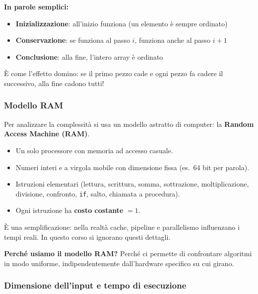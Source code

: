 \documentclass[a4paper, 11pt]{article}
\theoremstyle{definition}
\theoremstyle{remark}
\theoremstyle{remark}
\newenvironment{nota}{%
	\begin{tcolorbox}[
		colback=codebg,
		colframe=primary,
		fonttitle=\bfseries,
		title=Nota,
		left=6pt, right=6pt, top=4pt, bottom=4pt
		]
	}{%
	\end{tcolorbox}
}
\begin{document}
	\begin{softnote}
		\textbf{In parole semplici:}
		\begin{itemize}
			\item \textbf{Inizializzazione}: all'inizio funziona (un elemento è sempre ordinato)
			\item \textbf{Conservazione}: se funziona al passo $i$, funziona anche al passo $i+1$
			\item \textbf{Conclusione}: alla fine, l'intero array è ordinato
		\end{itemize}
		
		È come l'effetto domino: se il primo pezzo cade e ogni pezzo fa cadere il successivo, alla fine cadono tutti!
	\end{softnote}
	
	\subsubsection*{Modello RAM}
	
	
	Per analizzare la complessità si usa un modello astratto di
	computer: la \textbf{Random Access Machine (RAM)}.
	
	\begin{itemize}
		\item Un solo processore con memoria ad accesso casuale.
		\item Numeri interi e a virgola mobile con dimensione fissa
		(es.\ 64 bit per parola).
		\item Istruzioni elementari (lettura, scrittura, somma,
		sottrazione, moltiplicazione, divisione, confronto,
		\texttt{if}, salto, chiamata a procedura).
		\item Ogni istruzione ha \textbf{costo costante} $= 1$.
	\end{itemize}
	
	\begin{nota}
		È una semplificazione: nella realtà cache, pipeline e
		parallelismo influenzano i tempi reali. In questo corso
		si ignorano questi dettagli.
		
		\textbf{Perché usiamo il modello RAM?} Perché ci permette di confrontare algoritmi in modo uniforme, indipendentemente dall'hardware specifico su cui girano.
	\end{nota}
	
	\subsubsection*{Dimensione dell'input e tempo di esecuzione}
	
\end{document}
